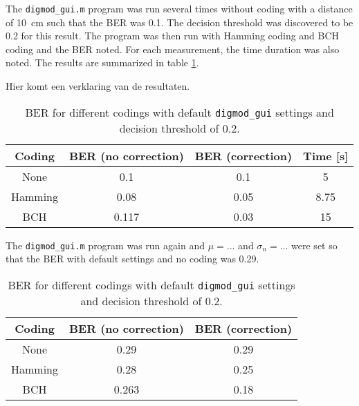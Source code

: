 \documentclass[11pt,titlepage]{report}
\begin{document}
The \texttt{digmod\_gui.m} program was run several times without coding with a distance of \SI{10}{\centi \meter} such that the BER was 0.1. The decision threshold was discovered to be 0.2 for this result. The program was then run with Hamming coding and BCH coding and the BER noted. For each measurement, the time duration was also noted. The results are summarized in table \ref{tab:task4-diff-coding}.

Hier komt een verklaring van de resultaten.

\begin{table}[H]
	\centering
	\caption{BER for different codings with default \texttt{digmod\_gui} settings and decision threshold of 0.2.}
	\label{tab:task4-diff-coding}
	\begin{tabular}{c c c c}
		\hline\hline
		Coding & BER (no correction) & BER (correction) & Time [s] \\
		\hline
		None & 0.1 & 0.1 & 5\\
		Hamming & 0.08 & 0.05 & 8.75 \\
		BCH & 0.117 & 0.03 & 15\\
		\hline
	\end{tabular}
\end{table}

The \texttt{digmod\_gui.m} program was run again and $\mu=...$ and $\sigma_n=...$ were set so that the BER with default settings and no coding was 0.29.

\begin{table}[H]
	\centering
	\caption{BER for different codings with default \texttt{digmod\_gui} settings and decision threshold of 0.2.}
	\label{tab:task4-diff-coding-mu-sigma}
	\begin{tabular}{c c c}
		\hline\hline
		Coding & BER (no correction) & BER (correction)\\
		\hline
		None & 0.29 & 0.29\\
		Hamming & 0.28 & 0.25 \\
		BCH & 0.263 & 0.18\\
		\hline
	\end{tabular}
\end{table}
\end{document}
